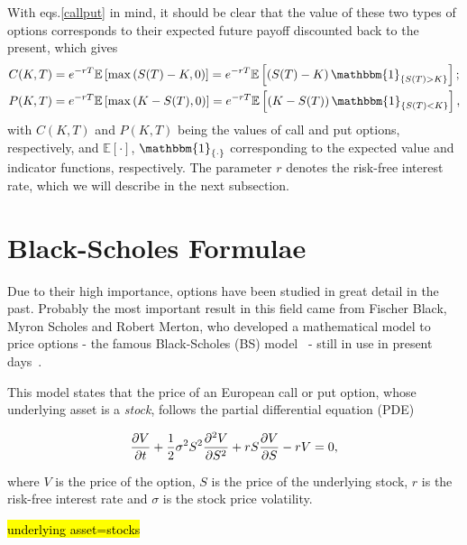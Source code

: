 With eqs.\eqref{callput} in mind, it should be clear that the value of these two types of options corresponds to their expected future payoff discounted back to the present, which gives
\begin{equation}
\begin{split}
&C(K,T)=e^{-rT}\mathbb{E}\left[\max\left(S(T)-K,0\right)\right]=e^{-rT}\mathbb{E}\left[\left(S(T)-K\right)\mathbbm{1}_{\left\{S(T)>K\right\}}\right];\\
&P(K,T)=e^{-rT}\mathbb{E}\left[\max\left(K-S(T),0\right)\right]=e^{-rT}\mathbb{E}\left[\left(K-S(T)\right)\mathbbm{1}_{\left\{S(T)<K\right\}}\right],
\end{split}
\end{equation}
\noindent with $C(K,T)$ and $P(K,T)$ being the values of call and put options, respectively, and $\mathbb{E}[\cdot]$, $\mathbbm{1}_{\{\cdot\}}$ corresponding to the expected value and indicator functions, respectively. The parameter $r$ denotes the risk-free interest rate, which we will describe in the next subsection.




    
\section{Black-Scholes Formulae}
\label{section:Black-Scholes Formulae}
Due to their high importance, options have been studied in great detail in the past.
Probably the most important result in this field came from Fischer Black, Myron Scholes and Robert Merton, who developed a mathematical model to price options - the famous Black-Scholes (BS) model~\cite{Scholes} - still in use in present days~\cite{Wilmott3}.

This model states that the price of an European call or put option, whose underlying asset is a \emph{stock}, follows the partial differential equation (PDE)

\begin{equation}\label{BS2}
\pdv{V}{t}+\frac{1}{2}\sigma^2S^2\pdv{^2V}{S^2}+rS\pdv{V}{S}-rV=0,
\end{equation}

\noindent where $V$ is the price of the option, $S$ is the price of the underlying stock, $r$ is the risk-free interest rate and $\sigma$ is the stock price volatility.

\hl{underlying asset=stocks}
 
